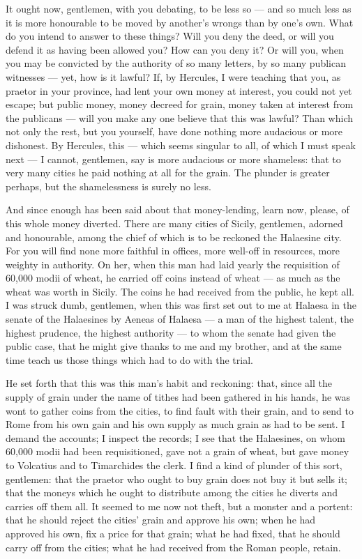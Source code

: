  It ought now, gentlemen, with you debating, to be less so --- and so much less as it is more honourable to be moved by another's wrongs than by one's own. What do you intend to answer to these things? Will you deny the deed, or will you defend it as having been allowed you? How can you deny it? Or will you, when you may be convicted by the authority of so many letters, by so many publican witnesses --- yet, how is it lawful? If, by Hercules, I were teaching that you, as praetor in your province, had lent your own money at interest, you could not yet escape; but public money, money decreed for grain, money taken at interest from the publicans --- will you make any one believe that this was lawful? Than which not only the rest, but you yourself, have done nothing more audacious or more dishonest. By Hercules, this --- which seems singular to all, of which I must speak next --- I cannot, gentlemen, say is more audacious or more shameless: that to very many cities he paid nothing at all for the grain. The plunder is greater perhaps, but the shamelessness is surely no less.

 And since enough has been said about that money-lending, learn now, please, of this whole money diverted. There are many cities of Sicily, gentlemen, adorned and honourable, among the chief of which is to be reckoned the Halaesine city. For you will find none more faithful in offices, more well-off in resources, more weighty in authority. On her, when this man had laid yearly the requisition of 60,000 modii of wheat, he carried off coins instead of wheat --- as much as the wheat was worth in Sicily. The coins he had received from the public, he kept all. I was struck dumb, gentlemen, when this was first set out to me at Halaesa in the senate of the Halaesines by Aeneas of Halaesa --- a man of the highest talent, the highest prudence, the highest authority --- to whom the senate had given the public case, that he might give thanks to me and my brother, and at the same time teach us those things which had to do with the trial.

 He set forth that this was this man's habit and reckoning: that, since all the supply of grain under the name of tithes had been gathered in his hands, he was wont to gather coins from the cities, to find fault with their grain, and to send to Rome from his own gain and his own supply as much grain as had to be sent. I demand the accounts; I inspect the records; I see that the Halaesines, on whom 60,000 modii had been requisitioned, gave not a grain of wheat, but gave money to Volcatius and to Timarchides the clerk. I find a kind of plunder of this sort, gentlemen: that the praetor who ought to buy grain does not buy it but sells it; that the moneys which he ought to distribute among the cities he diverts and carries off them all. It seemed to me now not theft, but a monster and a portent: that he should reject the cities' grain and approve his own; when he had approved his own, fix a price for that grain; what he had fixed, that he should carry off from the cities; what he had received from the Roman people, retain.

